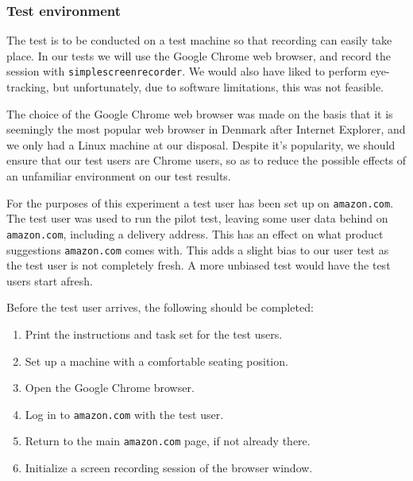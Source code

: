 \subsubsection{Test environment}

The test is to be conducted on a test machine so that recording can easily take
place. In our tests we will use the Google Chrome web browser, and record the
session with \texttt{simplescreenrecorder}\footnotemark. We would also have
liked to perform eye-tracking, but unfortunately, due to software limitations,
this was not feasible.


The choice of the Google Chrome web browser was made on the basis that it is
seemingly the most popular web browser in Denmark after Internet
Explorer\footnotemark, and we only had a Linux machine at our disposal. Despite
it's popularity, we should ensure that our test users are Chrome users, so as
to reduce the possible effects of an unfamiliar environment on our test
results\cite{molich}.


For the purposes of this experiment a test user has been set up on
\texttt{amazon.com}. The test user was used to run the pilot test, leaving some
user data behind on \texttt{amazon.com}, including a delivery address. This has
an effect on what product suggestions \texttt{amazon.com} comes with. This adds
a slight bias to our user test as the test user is not completely fresh. A more
unbiased test would have the test users start afresh.

Before the test user arrives, the following should be completed:

\begin{enumerate}

\item Print the instructions and task set for the test users.

\item Set up a machine with a comfortable seating position.

\item Open the Google Chrome browser.

\item Log in to \texttt{amazon.com} with the test user.


\item Return to the main \texttt{amazon.com} page, if not already there.

\item Initialize a screen recording session of the browser window.

\end{enumerate}

